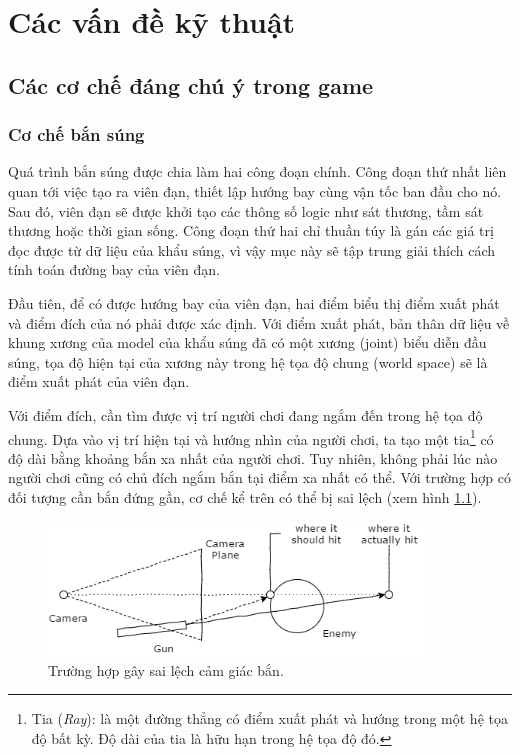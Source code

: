 \documentclass[12pt]{report}
\begin{document}
\chapter{Các vấn đề kỹ thuật}
\section{Các cơ chế đáng chú ý trong game}

\subsection{Cơ chế bắn súng}
Quá trình bắn súng được chia làm hai công đoạn chính. Công đoạn thứ nhất liên quan tới việc tạo ra viên đạn, thiết lập hướng bay cùng vận tốc ban đầu cho nó. Sau đó, viên đạn sẽ được khởi tạo các thông số logic như sát thương, tầm sát thương hoặc thời gian sống. Công đoạn thứ hai chỉ thuần túy là gán các giá trị đọc được từ dữ liệu của khẩu súng, vì vậy mục này sẽ tập trung giải thích cách tính toán đường bay của viên đạn.

Đầu tiên, để có được hướng bay của viên đạn, hai điểm biểu thị điểm xuất phát và điểm đích của nó phải được xác định. Với điểm xuất phát, bản thân dữ liệu về khung xương của model của khẩu súng đã có một xương (joint) biểu diễn đầu súng, tọa độ hiện tại của xương này trong hệ tọa độ chung (world space) sẽ là điểm xuất phát của viên đạn.

Với điểm đích, cần tìm được vị trí người chơi đang ngắm đến trong hệ tọa độ chung. Dựa vào vị trí hiện tại và hướng nhìn của người chơi, ta tạo một tia\footnote{Tia (\textit{Ray}): là một đường thẳng có điểm xuất phát và hướng trong một hệ tọa độ bất kỳ. Độ dài của tia là hữu hạn trong hệ tọa độ đó.} có độ dài bằng khoảng bắn xa nhất của người chơi. Tuy nhiên, không phải lúc nào người chơi cũng có chủ đích ngắm bắn tại điểm xa nhất có thể. Với trường hợp có đối tượng cần bắn đứng gần, cơ chế kể trên có thể bị sai lệch (xem hình \ref{fig:shootingwrong}).

\begin{figure}[H]
  \centering
    \includegraphics[width=10cm]{Pics/Chap5/shootingwrong.png}
  \caption{Trường hợp gây sai lệch cảm giác bắn.}
  \label{fig:shootingwrong}
\end{figure}
\end{document}
